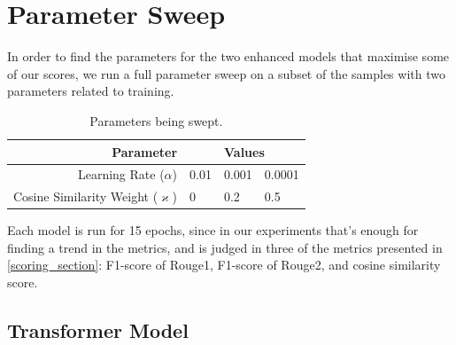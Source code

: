 \section{Parameter Sweep}
\label{param_sweep_section}

In order to find the parameters for the two enhanced models that maximise some of our scores, we run a full parameter sweep on a subset of the samples with two parameters related to training.
\begin{table}[h]
	\centering
	\small
	\begin{tabular}{r | l l l}
		\toprule
			Parameter & \multicolumn{3}{|c}{Values} \\
		\midrule
			Learning Rate ($\alpha$) & 0.01 & 0.001 & 0.0001 \\
			Cosine Similarity Weight ($\varkappa$) & 0 & 0.2 & 0.5 \\
		\bottomrule
	\end{tabular}
	\caption{Parameters being swept.}
\end{table}

Each model is run for 15 epochs, since in our experiments that's enough for finding a trend in the metrics, and is judged in three of the metrics presented in \cref{scoring_section}: F1-score of Rouge1, F1-score of Rouge2, and cosine similarity score.

\subsection{Transformer Model}

